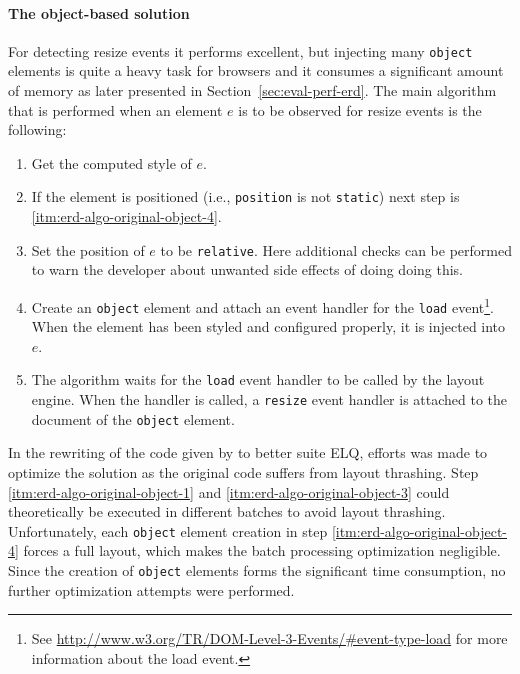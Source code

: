 \documentclass[a4paper,11pt]{kth-mag}
\newcommand{\code}[1]{\texttt{#1}}
\begin{document}
        \paragraph{The object-based solution}
        For detecting resize events it performs excellent, but injecting many \code{object} elements is quite a heavy task for browsers and it consumes a significant amount of memory as later presented in Section~\ref{sec:eval-perf-erd}.
        The main algorithm that is performed when an element $e$ is to be observed for resize events is the following:
        \begin{enumerate}
          \item\label{itm:erd-algo-original-object-1} Get the computed style of $e$.
          \item                                       If the element is positioned (i.e., \code{position} is not \code{static}) next step is \ref{itm:erd-algo-original-object-4}.
          \item\label{itm:erd-algo-original-object-3} Set the position of $e$ to be \code{relative}. Here additional checks can be performed to warn the developer about unwanted side effects of doing doing this.
          \item\label{itm:erd-algo-original-object-4} Create an \code{object} element and attach an event handler for the \code{load} event\footnote{See \url{http://www.w3.org/TR/DOM-Level-3-Events/\#event-type-load} for more information about the load event.}. When the element has been styled and configured properly, it is injected into $e$.
          \item                                       The algorithm waits for the \code{load} event handler to be called by the layout engine. When the handler is called, a \code{resize} event handler is attached to the document of the \code{object} element.
        \end{enumerate}
        In the rewriting of the code given by \cite{backalley} to better suite \gls{ELQ}, efforts was made to optimize the solution as the original code suffers from layout thrashing.
        Step \ref{itm:erd-algo-original-object-1} and \ref{itm:erd-algo-original-object-3} could theoretically be executed in different batches to avoid layout thrashing.
        Unfortunately, each \code{object} element creation in step \ref{itm:erd-algo-original-object-4} forces a full layout, which makes the batch processing optimization negligible.
        Since the creation of \code{object} elements forms the significant time consumption, no further optimization attempts were performed.
\end{document}
